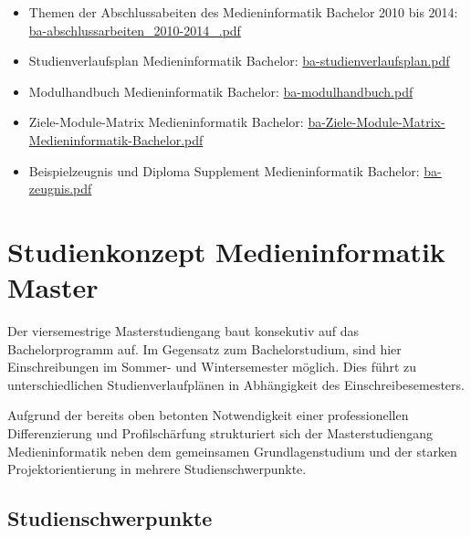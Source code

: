 \begin{itemize}
\tightlist
\item
  Themen der Abschlussabeiten des Medieninformatik Bachelor 2010 bis
  2014:
  \href{https://th-koeln.github.io/mi-2017/anhaenge/ba-abschlussarbeiten_2010-2014_.pdf}{ba-abschlussarbeiten\_2010-2014\_.pdf}
\item
  Studienverlaufsplan Medieninformatik Bachelor:
  \href{https://th-koeln.github.io/mi-2017/anhaenge/ba-studienverlaufsplan.pdf}{ba-studienverlaufsplan.pdf}
\item
  Modulhandbuch Medieninformatik Bachelor:
  \href{https://th-koeln.github.io/mi-2017/anhaenge/ba-modulhandbuch.pdf}{ba-modulhandbuch.pdf}
\item
  Ziele-Module-Matrix Medieninformatik Bachelor:
  \href{https://th-koeln.github.io/mi-2017/anhaenge/ba-Ziele-Module-Matrix-Medieninformatik-Bachelor.pdf}{ba-Ziele-Module-Matrix-Medieninformatik-Bachelor.pdf}
\item
  Beispielzeugnis und Diploma Supplement Medieninformatik Bachelor:
  \href{https://th-koeln.github.io/mi-2017/anhaenge/ba-zeugnis.pdf}{ba-zeugnis.pdf}
\end{itemize}

\section{Studienkonzept Medieninformatik
Master}\label{studienkonzept-medieninformatik-master}

Der viersemestrige Masterstudiengang baut konsekutiv auf das
Bachelorprogramm auf. Im Gegensatz zum Bachelorstudium, sind hier
Einschreibungen im Sommer- und Wintersemester möglich. Dies führt zu
unterschiedlichen Studienverlaufplänen in Abhängigkeit des
Einschreibesemesters.

Aufgrund der bereits oben betonten Notwendigkeit einer professionellen
Differenzierung und Profilschärfung strukturiert sich der
Masterstudiengang Medieninformatik neben dem gemeinsamen
Grundlagenstudium und der starken Projektorientierung in mehrere
Studienschwerpunkte.

\subsection{Studienschwerpunkte}\label{studienschwerpunkte}

